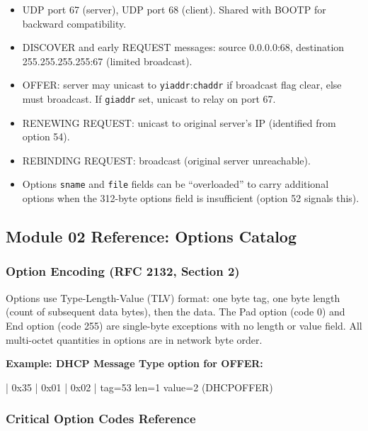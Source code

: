 \documentclass[11pt,letterpaper]{article}
\begin{document}
\begin{itemize}[noitemsep]
  \item UDP port 67 (server), UDP port 68 (client). Shared with BOOTP for backward compatibility.
  \item DISCOVER and early REQUEST messages: source 0.0.0.0:68, destination 255.255.255.255:67 (limited broadcast).
  \item OFFER: server may unicast to \texttt{yiaddr}:\texttt{chaddr} if broadcast flag clear, else must broadcast. If \texttt{giaddr} set, unicast to relay on port 67.
  \item RENEWING REQUEST: unicast to original server's IP (identified from option 54).
  \item REBINDING REQUEST: broadcast (original server unreachable).
  \item Options \texttt{sname} and \texttt{file} fields can be ``overloaded'' to carry additional options when the 312-byte options field is insufficient (option 52 signals this).
\end{itemize}

\subsection{Module 02 Reference: Options Catalog}

\subsubsection{Option Encoding (RFC 2132, Section 2)}

Options use Type-Length-Value (TLV) format: one byte tag, one byte length (count of subsequent data bytes), then the data. The Pad option (code 0) and End option (code 255) are single-byte exceptions with no length or value field. All multi-octet quantities in options are in network byte order.

\textbf{Example: DHCP Message Type option for OFFER:}

\begin{asciibox}
| 0x35 | 0x01 | 0x02 |
  tag=53  len=1   value=2 (DHCPOFFER)
\end{asciibox}

\subsubsection{Critical Option Codes Reference}
\end{document}
